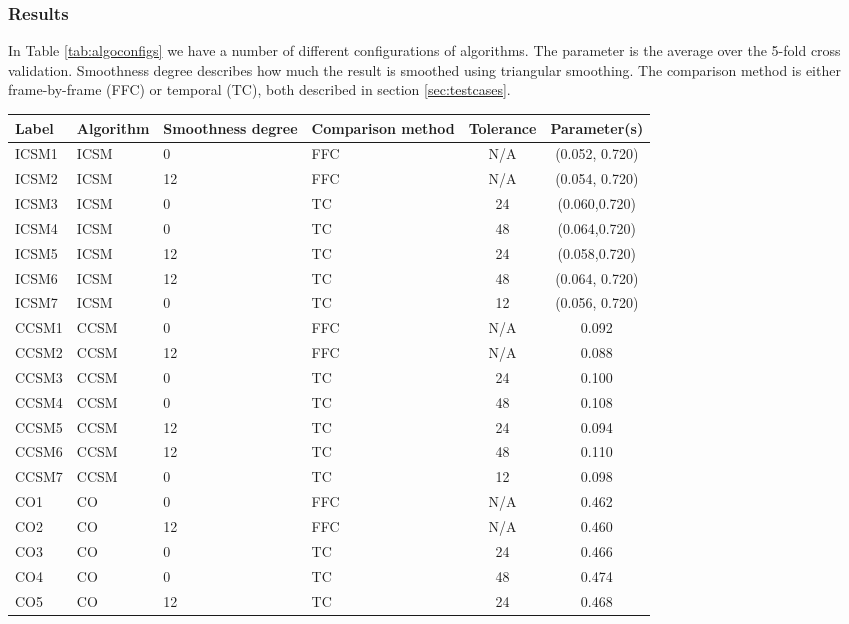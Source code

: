\subsubsection{Results}
In Table \ref{tab:algoconfigs} we have a number of different configurations of algorithms. The parameter is the average over the 5-fold cross validation. Smoothness degree describes how much the result is smoothed using triangular smoothing. The comparison method is either frame-by-frame (FFC) or temporal (TC), both described in section \ref{sec:testcases}.\\
%
\begin{table}
  \begin{tabular}{| l | l | p{2cm} | p{2cm} | c | c | }\hline
    Label & Algorithm & Smoothness degree & Comparison method & Tolerance & Parameter(s)\\\hline
    ICSM1 & ICSM & 0 & FFC & N/A & (0.052, 0.720) \\\hline
    ICSM2 & ICSM & 12 & FFC & N/A & (0.054, 0.720) \\\hline
    ICSM3 & ICSM & 0 & TC & 24 & (0.060,0.720) \\\hline
    ICSM4 & ICSM & 0 & TC & 48 & (0.064,0.720) \\\hline
    ICSM5 & ICSM & 12 & TC & 24 & (0.058,0.720) \\\hline
    ICSM6 & ICSM & 12 & TC & 48 & (0.064, 0.720) \\\hline
    ICSM7 & ICSM & 0 & TC & 12 & (0.056, 0.720) \\\hline\hline
%
    CCSM1 & CCSM & 0 & FFC & N/A & 0.092 \\\hline
    CCSM2 & CCSM & 12 & FFC & N/A & 0.088 \\\hline
    CCSM3 & CCSM & 0 & TC & 24 & 0.100 \\\hline
    CCSM4 & CCSM & 0 & TC & 48 & 0.108 \\\hline
    CCSM5 & CCSM & 12 & TC & 24 & 0.094 \\\hline
    CCSM6 & CCSM & 12 & TC & 48 & 0.110 \\\hline
    CCSM7 & CCSM & 0 & TC & 12 & 0.098 \\\hline\hline
%
    CO1 & CO & 0 & FFC & N/A & 0.462 \\\hline
    CO2 & CO & 12 & FFC & N/A & 0.460 \\\hline
    CO3 & CO & 0 & TC & 24 & 0.466 \\\hline
    CO4 & CO & 0 & TC & 48 & 0.474 \\\hline
    CO5 & CO & 12 & TC & 24 & 0.468 \\\hline

\end{tabular}
\end{table}
